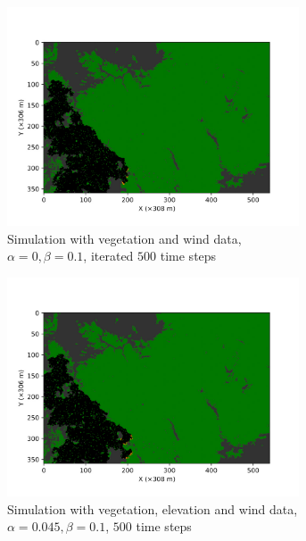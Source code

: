 \begin{figure}[H]
\begin{subfigure}[t]{0.47\textwidth}
    \includegraphics[width=0.95\textwidth]{Figures/LastFrame_03.jpg}
    \caption{Simulation with vegetation and wind data, $\alpha=0, \beta = 0.1$, iterated $500$ time steps}
    \label{fig:vegePlusWind}
  \end{subfigure}
  \begin{subfigure}[t]{0.47\textwidth}
    \includegraphics[width=0.95\textwidth]{Figures/LastFrame_04.jpg}
    \caption{Simulation with vegetation, elevation and wind data, $\alpha=0.045, \beta = 0.1$, $500$ time steps}
    \label{fig:vegePlusElePlusWind}
  \end{subfigure}
  \begin{subfigure}[t]{0.47\textwidth}

\end{subfigure}
\end{figure}
